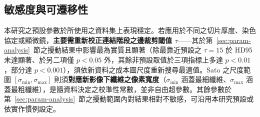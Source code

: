 \subsection{敏感度與可遷移性}

本研究之預設參數於所使用之資料集上表現穩定。若應用於不同之切片厚度、染色協定或顯微鏡，\textbf{主要需重新校正連結階段之邊裁剪閾值 $\tau$}——其於第~\ref{sec:param-analysis}~節之擾動結果中影響最為實質且顯著（除最靠近預設之 $\tau = 15$ 於 HD95 未達顯著、於另二項僅 $p < 0.05$ 外，其餘非預設取值於三項指標上多達 $p < 0.01$，部分達 $p < 0.001$），須依新資料之成本圖尺度重新搜尋最適值。Sato 之尺度範圍 $[\sigma_{\min}, \sigma_{\max}]$ 則須\textbf{對應新影像下纖維之像素寬度}（$\sigma_{\min}$ 涵蓋最細纖維、$\sigma_{\max}$ 涵蓋最粗纖維），是隨資料決定之校準性常數，並非自由超參數。其餘參數於第~\ref{sec:param-analysis}~節之擾動範圍內對結果相對不敏感，可沿用本研究預設或依實作慣例設定。

